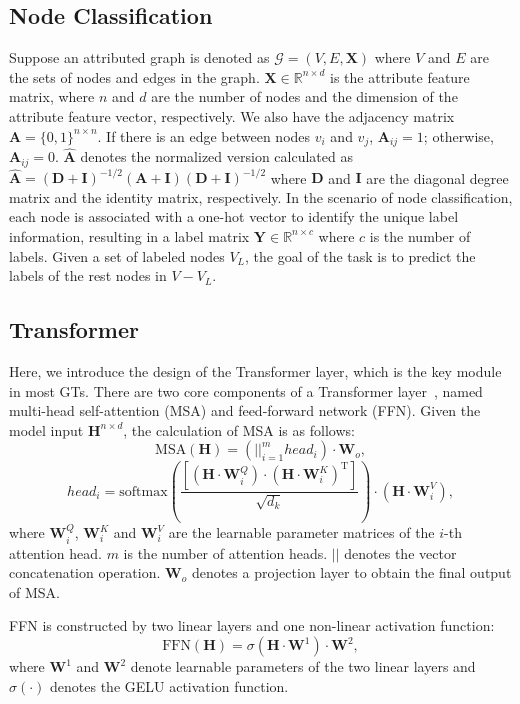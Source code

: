 

\subsection{Node Classification}
Suppose an attributed graph is denoted as $\mathcal{G}=(V, E, \mathbf{X})$ where $V$ and $E$ are the sets of nodes and edges in the graph.
$\mathbf{X} \in \mathbb{R}^{n \times d}$ is the attribute feature matrix, where $n$ and $d$ are the number of nodes and the dimension of the attribute feature vector, respectively.
We also have the adjacency matrix $\mathbf{A} = \{0, 1\}^{n\times n}$.
If there is an edge between nodes $v_i$ and $v_j$, $\mathbf{A}_{ij} = 1$; otherwise, $\mathbf{A}_{ij} = 0$. 
$\hat{\mathbf{A}}$ denotes the normalized version calculated as $\hat{\mathbf{A}}=(\mathbf{D}+\mathbf{I})^{-1/2}(\mathbf{A}+\mathbf{I})(\mathbf{D}+\mathbf{I})^{-1/2}$ where $\mathbf{D}$ and $\mathbf{I}$ are the diagonal degree matrix and the identity matrix, respectively.
In the scenario of node classification, each node is associated with a one-hot vector to identify the unique label information, resulting in a label matrix $\mathbf{Y} \in \mathbb{R}^{n \times c}$ where $c$ is the number of labels.
Given a set of labeled nodes $V_L$, the goal of the task is to predict the labels of the rest  nodes in $V-V_L$.


\subsection{Transformer}
Here, we introduce the design of the Transformer layer, which is the key module in most GTs. 
There are two core components of a Transformer layer~\cite{transformer}, named multi-head self-attention (MSA) and feed-forward network (FFN).
Given the model input $\mathbf{H}^{n\times d}$, the calculation of MSA is as follows:
\begin{equation}
    \mathrm{MSA}(\mathbf{H}) = (||_{i=1}^{m}head_i)\cdot \mathbf{W}_{o},
    \label{eq:msa}
\end{equation}
\begin{equation}
    head_i = \mathrm{softmax}\left(\frac{[(\mathbf{H}\cdot\mathbf{W}^{Q}_{i}) \cdot (\mathbf{H}\cdot\mathbf{W}^{K}_{i})^{\mathrm{T}}]}{\sqrt{d_k}}\right)\cdot (\mathbf{H}\cdot\mathbf{W}^{V}_{i}), 
    \label{eq:single-head}
\end{equation}
where $\mathbf{W}^{Q}_{i}$, $\mathbf{W}^{K}_{i}$ and $\mathbf{W}^{V}_{i}$ are the learnable parameter matrices of the $i$-th attention head.
$m$ is the number of attention heads.
$||$ denotes the vector concatenation operation.
$\mathbf{W}_{o}$ denotes a projection layer to obtain the final output of MSA.

FFN is constructed by two linear layers and one non-linear activation function:
\begin{equation}
    \mathrm{FFN}(\mathbf{H}) = \sigma(\mathbf{H}\cdot\mathbf{W}^{1})\cdot\mathbf{W}^{2},
    \label{eq:ffn}
\end{equation}
where $\mathbf{W}^{1}$ and $\mathbf{W}^{2}$ denote learnable parameters of the two linear layers and $\sigma(\cdot)$ denotes the GELU activation function.